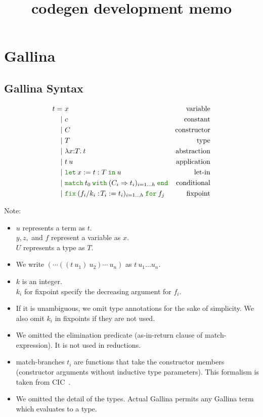 \documentclass[a4paper,fleqn]{article}
\title{codegen development memo}
\def\gallina{\textrm{Gallina}}
\newcommand{\kwlet}{\mbox{\color{mygreen}\ttfamily let}}
\newcommand{\kwin}{\mbox{\color{mygreen}\ttfamily in}}
\newcommand{\kwmatch}{\mbox{\color{mygreen}\ttfamily match}}
\newcommand{\kwas}{\mbox{\color{mygreen}\ttfamily as}}
\newcommand{\kwreturn}{\mbox{\color{mygreen}\ttfamily return}}
\newcommand{\kwwith}{\mbox{\color{mygreen}\ttfamily with}}
\newcommand{\kwend}{\mbox{\color{mygreen}\ttfamily end}}
\newcommand{\kwfix}{\mbox{\color{mygreen}\ttfamily fix}}
\newcommand{\kwfor}{\mbox{\color{mygreen}\ttfamily for}}
\newcommand{\lamT}[3]{\lambda #1\mathord{:}#2.\:#3}
\newcommand{\letin}[3]{\kwlet\:#1:=#2\:\kwin\:#3}
\newcommand{\match}[4]{\kwmatch\:#1\:\kwwith\:(#2 \Rightarrow #3)_{#4}\:\kwend}
\newcommand{\fixT}[5]{\kwfix\:(#1:\!#2 := #3)_{#4}\:\kwfor\:#5}
\begin{document}
\maketitle

\section{\gallina{}}\label{sec:gallina}
\subsection{\gallina{} Syntax}\label{sec:gallina-syntax}

\begin{align*}
  t =&\ x & \text{variable} \\
    |&\ c & \text{constant} \\
    |&\ C & \text{constructor} \\
    |&\ T & \text{type} \\
    |&\ \lamT{x}{T}{t}        & \text{abstraction} \\
    |&\ t\:u                  & \text{application} \\
    |&\ \letin{x}{t:T}{u}     & \text{let-in} \\
    |&\ \match{t_0}{C_i}{t_i}{i=1\ldots h} & \text{conditional} \\
    |&\ \fixT{f_i/k_i}{T_i}{t_i}{i=1\ldots h}{f_j} & \text{fixpoint}
\end{align*}
{\small Note:
\begin{itemize}
  \item $u$ represents a term as $t$. \\ $y, z,$ and $f$ represent a variable as $x$. \\ $U$ represents a type as $T$.
  \item We write $(\cdots((t\:u_1)\:u_2)\cdots\:u_n)$ as $t\:u_1\ldots u_n$.
  \item $k$ is an integer. \\ $k_i$ for fixpoint specify the decreasing argument for $f_i$.
  \item If it is unambiguous, we omit type annotations for the sake of simplicity.  We also omit $k_i$ in fixpoints if they are not used.
  \item We omitted the elimination predicate (\kwas-\kwin-\kwreturn{} clause of \kwmatch-expression).  It is not used in reductions.
  \item \kwmatch-branches $t_i$ are functions that take the constructor members (constructor arguments without inductive type parameters).
    This formalism is taken from CIC~\cite{coqrefman8.12.0}.
  \item We omitted the detail of the types.  Actual \gallina{} permits any \gallina{} term which evaluates to a type.
\end{itemize}}
\end{document}
